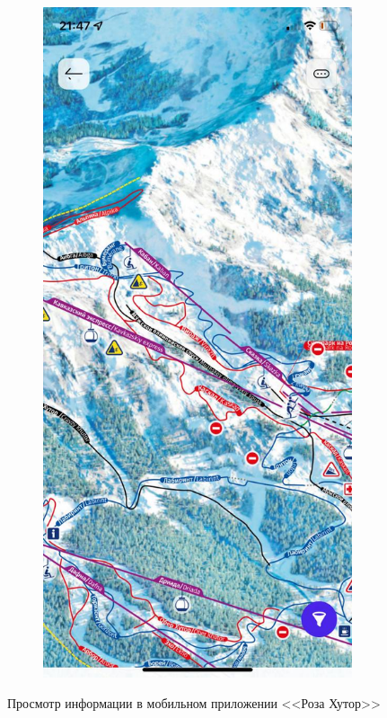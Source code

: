 \begin{figure}[h!]
\begin{center}
\begin{subfigure}{.33\textwidth}
			\captionsetup{justification=centering}
			\caption{}
		\end{subfigure}%
		\begin{subfigure}{.33\textwidth}
			\centering
			\includegraphics[width=.95\linewidth]{../imgs/analogue_apps/rmap.png}
			\label{img:rmap}
			\captionsetup{justification=centering}
			\caption{}
		\end{subfigure}
		\captionsetup{justification=centering}
		\caption{Просмотр информации в мобильном приложении <<Роза Хутор>>}
		\label{img:r}
	\end{center}
\end{figure}


